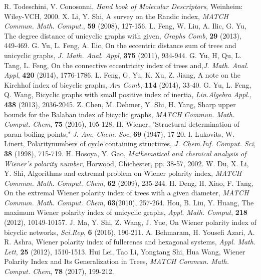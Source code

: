 \documentclass[12pt]{article}
\theoremstyle{theorem}
\theoremstyle{defi}
\begin{document}
\begin{thebibliography}{99}
R. Todeschini, V. Conosonni, {\it Hand book of Molecular Descriptors}, Weinheim: Wiley-VCH, 2000. 
X. Li, Y. Shi, A survey on the Randic index, {\it MATCH Commun. Math. Comput.}, {\bf 59} (2008), 127-156.
L. Feng, W. Liu, A. Ilic, G. Yu, The degree distance of unicyclic graphs with given, {\it Graphs Comb}, {\bf 29} (2013), 449-469. 
G. Yu, L. Feng, A. Ilic, On the eccentric distance sum of trees and unicyclic graphs, {\it J. Math. Anal. Appl}, {\bf 375} (2011), 934-944.
G. Yu, H, Qu, L. Tang, L. Feng, On the connective eccentricity index of trees and,{\it J. Math. Anal. Appl}, {\bf 420} (2014), 1776-1786.
L. Feng, G. Yu, K. Xu, Z. Jiang, A note on the Kirchhof index of bicyclic graphs, {\it Ars Comb}, {\bf 114} (2014), 33-40.
G. Yu, L. Feng, Q. Wang, Bicyclic graphs with small positive index of inertia, {\it Lin.Algebra Appl.}, {\bf 438} (2013), 2036-2045.
Z. Chen, M. Dehmer, Y. Shi, H. Yang, Sharp upper bounds for the Balaban index of bicyclic graphs, {\it MATCH Commun. Math. Comput. Chem}, {\bf 75} (2016), 105-128.
H. Wiener, "Structural determination of paran boiling points," {\it J. Am. Chem. Soc}, {\bf 69} (1947), 17-20. 
I. Lukovits, W. Linert, Polarity{numbers of cycle containing structures}, {\it J. Chem.Inf. Comput. Sci}, {\bf 38} (1998), 715-719. 
H. Hosoya, Y. Gao, {\it Mathematical and chemical analysis of Wiener's polarity number}, Horwood, Chichester, pp. 38-57, 2002. 
W. Du, X. Li, Y. Shi, Algorithms and extremal problem on Wiener polarity index, {\it MATCH Commun. Math. Comput. Chem}, {\bf 62} (2009), 235-244. 
H. Deng, H. Xiao, F. Tang, On the extremal Wiener polarity index of trees with a given diameter, {\it MATCH Commun. Math. Comput. Chem}, {\bf 63}(2010), 257-264. 
Hou, B. Liu, Y. Huang, The maximum Wiener polarity index of unicyclic graphs, {\it Appl. Math. Comput}, {\bf 218} (2012), 10149-10157. 
J. Ma, Y. Shi, Z. Wang, J. Yue, On Wiener polarity index of bicyclic networks, {\it Sci.Rep}, {\bf 6} (2016), 190-211. 
A. Behmaram, H. Yousefi Azari, A. R. Ashra, Wiener polarity index of fullerenes and hexagonal systems, {\it Appl. Math. Lett}, {\bf 25} (2012), 1510-1513.
Hui Lei, Tao Li, Yongtang Shi, Hua Wang, Wiener Polarity Index and Its Generalization in Trees, {\it MATCH Commun. Math. Comput. Chem}, {\bf 78} (2017), 199-212. 

\end{thebibliography}
\end{document}
